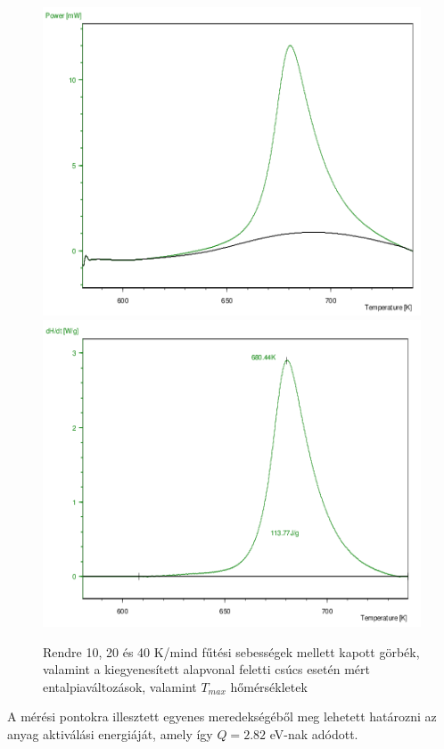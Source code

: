 \documentclass[12pt,a4paper]{article}
\begin{document}
\begin{figure}[!htb]
  \includegraphics[width=\linewidth]{6fin}
\endminipage
\hspace*{10pt}
  \includegraphics[width=\linewidth]{7fin}
\endminipage
\caption{Rendre 10, 20 és 40 K/mind fűtési sebességek mellett kapott görbék, valamint a kiegyenesített alapvonal feletti csúcs esetén mért entalpiaváltozások, valamint $T_{max}$ hőmérsékletek}
\label{fig:megnincs}
\end{figure}
A mérési pontokra illesztett egyenes meredekségéből meg lehetett határozni az anyag aktiválási energiáját, amely így $Q=2.82$ eV-nak adódott.
\newpage
\end{document}

